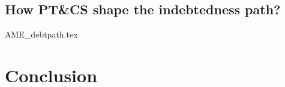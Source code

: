 \documentclass[a4paper, 11pt, onecolumn]{article}
\begin{document}
\subsection{How PT\&CS shape the indebtedness path?}

{AME_debtpath.tex}



\section{Conclusion}
\label{Conclusion}



\clearpage
\newpage
%




\newpage
\appendix
{}







\end{document}
